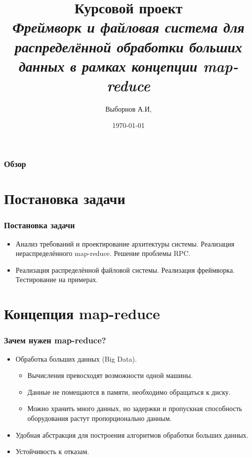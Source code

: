 \documentclass{beamer}
\title[Distributed map-reduce]{Курсовой проект \\ \it{Фреймворк и файловая система для распределённой обработки больших данных в рамках концепции map-reduce}}
\author{Выборнов А.И,} %
\institute[МГТУ ИУ-9] {
    МГТУ~им.~Н.~Э.~Баумана \\
    \medskip
    \text{art-vybor@ya.com}
}
\date{\today}
\begin{document}
\begin{frame}
    \titlepage
\end{frame}


\begin{frame}
\frametitle{Обзор} 
\tableofcontents 
\end{frame}


\section{Постановка задачи}
    \begin{frame}
    \frametitle{Постановка задачи}
        \begin{itemize}
            \item Анализ требований и проектирование архитектуры системы. Реализация нераспределённого map-reduce. Решение проблемы RPC.
            \item Реализация распределённой файловой системы. Реализация фреймворка. Тестирование на примерах.
            
        \end{itemize} 
    \end{frame}

\section{Концепция map-reduce}
    \begin{frame}
    \frametitle{Зачем нужен map-reduce?}
        \begin{itemize}
            \item Обработка больших данных (Big Data).
            \begin{itemize}
                \item Вычисления превосходят возможности одной машины.  
                \item Данные не помещаются в памяти, необходимо обращаться к диску.
                \item Можно хранить много данных, но задержки и пропускная способность оборудования растут пропорционально данным.
            \end{itemize}
            \item Удобная абстракция для построения алгоритмов обработки больших данных.
            \item Устойчивость к отказам.            
        \end{itemize} 
    \end{frame}
\end{document}
